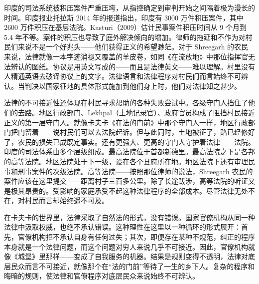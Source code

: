 \documentclass[12pt,a4paper]{article}
\begin{document}
印度的司法系统被积压案件严重压垮，从指控确定到审判开始之间隔着极为漫长的时间。印度报业托拉斯 2014 年的报道指出，印度有 3000 万件积压案件，其中 2600 万件积压在基层法院。Kasturi（2009）估计民事案件积压时间从 9 个月到 5.4 年不等。案件的积压也导致了庭外解决倾向的增加。律师的拖延和不作为对村民们来说不是一个好兆头——他们获得正义的希望渺茫。对于 Shreegarh 的农民来说，法律就像一本字迹消褪又覆盖的羊皮卷，如同《在流放地》中那位指挥官无法辨认的图纸。协议是用英文写成的——而且是法律英文——难以理解。村里没有人精通英语去破译协议上的文字。法律语言和法律程序对村民们而言始终不可辨认。当判决以国家征地的具体形式施加到他们身上时，他们对法律知之甚少。



法律的不可接近性还体现在村民寻求帮助的各种失败尝试中。各级守门人挡住了他们的去路。地区行政部门、Lekhpal（土地记录官）、政府官员构成了阻挡村民接近正义的第一层守门人。就像卡夫卡《在法的门前》中那个守门人一样，地区行政部门把门留着——说村民们可以去法院起诉。但与此同时，土地被征了，路已经修好了，农民的损失已成既定事实。还有更强大、更高的守门人守护着法律——法院。印度的司法体系由多个层级组成。最高法院位于首都新德里。最高法院之下是各邦的高等法院。地区法院处于下一级，设在各个县府所在地。地区法院下还有审理民事和刑事案件的次级法院。高等法院——按照那位律师的说法，Shreegarh 农民的案件应该在这里提交——距离村子三百多公里。除了长途跋涉，高等法院的听证又是极其昂贵的。受影响的家庭承受不起这种法律程序的全部成本。尽管法律无处不在，对村民而言却始终遥不可及。



在卡夫卡的世界里，法律采取了自然法的形式，没有错误。国家官僚机构从同一种法律中汲取权威，也绝不承认错误。这种理性在这里以一种循环的形式展开：首先，官僚机构拒不承认自身有任何过失；其次，即便存在某种不规范，纠正的程序本身就是一个法律问题，而这个问题对穷人来说几乎不可接近。因此，官僚机构就像《城堡》里那样——变成了自我服务的机器。结果是规则变得不透明，法律对底层民众而言不可接近，就像那个在“法的门前”等待了一生的乡下人。复杂的程序和晦暗的规则，使法律和官僚程序对底层民众来说始终不可辨认。
\par{}
\end{document}
